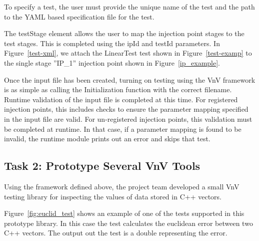 To specify a test, the user must provide the unique name of the test and the path to the
YAML based specification file for the test. 

The testStage element allows the user to map the injection point stages to the test stages. This is completed using the ipId and
testId parameters. In Figure~\ref{test-xml}, we attach the LinearTest test shown in Figure~\ref{test-examp} to the single stage ''IP\_1''
 injection point shown in Figure~\ref{ip_example}. 

 
Once the input file has been created, turning on testing using the VnV framework is as simple as calling the Initialization function with the correct filename. Runtime 
validation of the input file is completed at this time. For registered injection points, this includes checks to ensure the parameter mapping specified in the input file
are valid. For un-registered injection points, this validation must be completed at runtime. In that case, if a parameter mapping is found to be invalid, the runtime module 
prints out an error and skips that test. 

\subsection{Task 2: Prototype Several VnV Tools } 

Using the framework defined above, the project team developed a small VnV testing library for inspecting the values of data stored in
C++ vectors. 

Figure~\ref{fig:euclid_test} shows an example of one of the tests supported in this prototype library. In this case the test calculates the euclidean
error between two C++ vectors. The output out the test is a double representing the error. 

